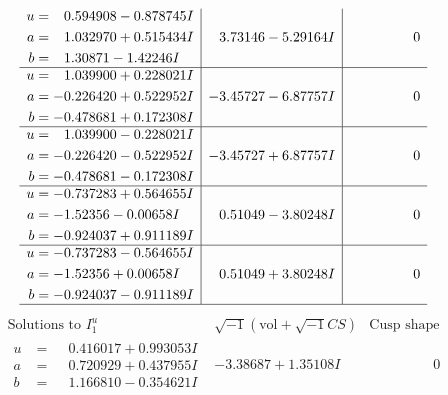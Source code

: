 \documentclass[1p]{elsarticle_modified}
\theoremstyle{definition}
\newcommand{\I}{\sqrt{-1}}
\begin{document}
$$\begin{array}{c|c|c}
\begin{aligned}
u &= \phantom{-}0.594908 - 0.878745 I \\
a &= \phantom{-}1.032970 + 0.515434 I \\
b &= \phantom{-}1.30871 - 1.42246 I\end{aligned}
 & \phantom{-}3.73146 - 5.29164 I & \phantom{-0.000000 } 0 \\ \hline\begin{aligned}
u &= \phantom{-}1.039900 + 0.228021 I \\
a &= -0.226420 + 0.522952 I \\
b &= -0.478681 + 0.172308 I\end{aligned}
 & -3.45727 - 6.87757 I & \phantom{-0.000000 } 0 \\ \hline\begin{aligned}
u &= \phantom{-}1.039900 - 0.228021 I \\
a &= -0.226420 - 0.522952 I \\
b &= -0.478681 - 0.172308 I\end{aligned}
 & -3.45727 + 6.87757 I & \phantom{-0.000000 } 0 \\ \hline\begin{aligned}
u &= -0.737283 + 0.564655 I \\
a &= -1.52356 - 0.00658 I \\
b &= -0.924037 + 0.911189 I\end{aligned}
 & \phantom{-}0.51049 - 3.80248 I & \phantom{-0.000000 } 0 \\ \hline\begin{aligned}
u &= -0.737283 - 0.564655 I \\
a &= -1.52356 + 0.00658 I \\
b &= -0.924037 - 0.911189 I\end{aligned}
 & \phantom{-}0.51049 + 3.80248 I & \phantom{-0.000000 } 0\\
 \hline 
 \end{array}$$\newpage$$\begin{array}{c|c|c}  
\text{Solutions to }I^u_{1}& \I (\text{vol} + \sqrt{-1}CS) & \text{Cusp shape}\\
 \hline 
\begin{aligned}
u &= \phantom{-}0.416017 + 0.993053 I \\
a &= \phantom{-}0.720929 + 0.437955 I \\
b &= \phantom{-}1.166810 - 0.354621 I\end{aligned}
 & -3.38687 + 1.35108 I & \phantom{-0.000000 } 0 \\ \hline\begin{aligned}

\end{aligned}
\end{array}$$
\end{document}
